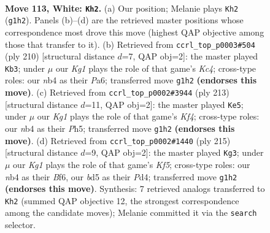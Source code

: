 \documentclass[11pt]{article}
\begin{document}
\clearpage

\begin{figure}[p]\centering
\begin{subfigure}{0.46\textwidth}\centering
\resizebox{\linewidth}{!}{%
\newchessgame
\chessboard[
  setfen={8/8/8/3b3k/1n1B4/8/5P2/6K1 w - - 71 113},
  showmover=false,
  pgfstyle=straightmove, color=movearrow, markmove={g1-h2}
]}
\caption{}
\end{subfigure}\hfill
\begin{subfigure}{0.46\textwidth}\centering
\resizebox{\linewidth}{!}{%
\newchessgame
\chessboard[
  setfen={8/b3k3/P7/3P4/2K5/5B2/8/8 w - - 23 106},
  showmover=false,
  pgfstyle=straightmove, color=movearrow, markmove={c4-b3}
]}
\caption{}
\end{subfigure}
\\[4pt]
\begin{subfigure}{0.46\textwidth}\centering
\resizebox{\linewidth}{!}{%
\newchessgame
\chessboard[
  setfen={8/1b6/8/5k1p/5p1B/8/8/5K2 b - - 61 107},
  showmover=false,
  pgfstyle=straightmove, color=movearrow, markmove={f5-e5}
]}
\caption{}
\end{subfigure}\hfill
\begin{subfigure}{0.46\textwidth}\centering
\resizebox{\linewidth}{!}{%
\newchessgame
\chessboard[
  setfen={8/1B6/5b2/8/3p1kp1/8/4K3/8 b - - 9 108},
  showmover=false,
  pgfstyle=straightmove, color=movearrow, markmove={f4-g3}
]}
\caption{}
\end{subfigure}
\caption{\textbf{Move 113, White: \texttt{Kh2}.} (a) Our position; Melanie plays \texttt{Kh2} (\texttt{g1h2}). Panels (b)--(d) are the retrieved master positions whose correspondence most drove this move (highest QAP objective among those that transfer to it). (b) Retrieved from \texttt{ccrl\_top\_p0003\#504} (ply 210) [structural distance $d$=7, QAP obj=2]: the master played \texttt{Kb3}; under $\mu$ our \emph{Kg1} plays the role of that game's \emph{Kc4}; cross-type roles: our \emph{n}b4 as their \emph{P}a6; transferred move \texttt{g1h2} \textbf{(endorses this move)}. (c) Retrieved from \texttt{ccrl\_top\_p0002\#3944} (ply 213) [structural distance $d$=11, QAP obj=2]: the master played \texttt{Ke5}; under $\mu$ our \emph{Kg1} plays the role of that game's \emph{Kf4}; cross-type roles: our \emph{n}b4 as their \emph{P}h5; transferred move \texttt{g1h2} \textbf{(endorses this move)}. (d) Retrieved from \texttt{ccrl\_top\_p0002\#1440} (ply 215) [structural distance $d$=9, QAP obj=2]: the master played \texttt{Kg3}; under $\mu$ our \emph{Kg1} plays the role of that game's \emph{Kf5}; cross-type roles: our \emph{n}b4 as their \emph{B}f6, our \emph{b}d5 as their \emph{P}d4; transferred move \texttt{g1h2} \textbf{(endorses this move)}. Synthesis: 7 retrieved analogs transferred to \texttt{Kh2} (summed QAP objective 12, the strongest correspondence among the candidate moves); Melanie committed it via the \texttt{search} selector.}
\label{fig:thought-m224}
\end{figure}
\end{document}
